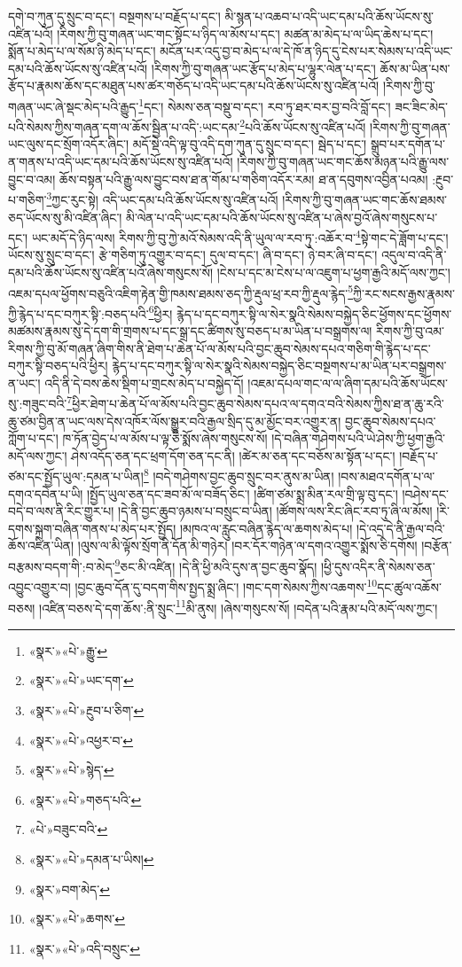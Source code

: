 དགེ་བ་ཀུན་དུ་སྲུང་བ་དང་། བསྔགས་པ་བརྗོད་པ་དང་། མི་སྙན་པ་འཆབ་པ་འདི་ཡང་དམ་པའི་ཆོས་ཡོངས་སུ་འཛིན་པའོ། །རིགས་ཀྱི་བུ་གཞན་ཡང་གང་སྟོང་པ་ཉིད་ལ་མོས་པ་དང་། མཚན་མ་མེད་པ་ལ་ཡིད་ཆེས་པ་དང་། སྨོན་པ་མེད་པ་ལ་སོམ་ཉི་མེད་པ་དང་། མངོན་པར་འདུ་བྱ་བ་མེད་པ་ལ་དེ་ཁོ་ན་ཉིད་དུ་ངེས་པར་སེམས་པ་འདི་ཡང་དམ་པའི་ཆོས་ཡོངས་སུ་འཛིན་པའོ། །རིགས་ཀྱི་བུ་གཞན་ཡང་རྩོད་པ་མེད་པ་ལྷུར་ལེན་པ་དང་། ཆོས་མ་ཡིན་པས་རྩོད་པ་རྣམས་ཆོས་དང་མཐུན་པས་ཚར་གཅོད་པ་འདི་ཡང་དམ་པའི་ཆོས་ཡོངས་སུ་འཛིན་པའོ། །རིགས་ཀྱི་བུ་གཞན་ཡང་ཞེ་སྡང་མེད་པའི་རྒྱུད་\footnote{«སྣར་»«པེ་»རྒྱུ་}དང་། སེམས་ཅན་བསྡུ་བ་དང་། རབ་ཏུ་ཐར་བར་བྱ་བའི་བློ་དང་། ཟང་ཟིང་མེད་པའི་སེམས་ཀྱིས་གཞན་དག་ལ་ཆོས་སྦྱིན་པ་འདི་:ཡང་དམ་\footnote{«སྣར་»«པེ་»ཡང་དག་}པའི་ཆོས་ཡོངས་སུ་འཛིན་པའོ། །རིགས་ཀྱི་བུ་གཞན་ཡང་ལུས་དང་སྲོག་འདོར་ཞིང་། མདོ་སྡེ་འདི་ལྟ་བུ་འདི་དག་ཀུན་དུ་སྲུང་བ་དང་། སྦེད་པ་དང་། སྒྲུབ་པར་དགོན་པ་ན་གནས་པ་འདི་ཡང་དམ་པའི་ཆོས་ཡོངས་སུ་འཛིན་པའོ། །རིགས་ཀྱི་བུ་གཞན་ཡང་གང་ཆོས་མཉན་པའི་རྒྱུ་ལས་བྱུང་བ་འམ། ཆོས་བསྟན་པའི་རྒྱུ་ལས་བྱུང་བས་ཐ་ན་གོམ་པ་གཅིག་འདོར་རམ། ཐ་ན་དབུགས་འབྱིན་པའམ། :རྔུབ་པ་གཅིག་\footnote{«སྣར་»«པེ་»རྔུབ་པ་ཅིག་}ཀྱང་རུང་སྟེ། འདི་ཡང་དམ་པའི་ཆོས་ཡོངས་སུ་འཛིན་པའོ། །རིགས་ཀྱི་བུ་གཞན་ཡང་གང་ཆོས་ཐམས་ཅད་ཡོངས་སུ་མི་འཛིན་ཞིང་། མི་ལེན་པ་འདི་ཡང་དམ་པའི་ཆོས་ཡོངས་སུ་འཛིན་པ་ཞེས་བྱའོ་ཞེས་གསུངས་པ་དང་། ཡང་མདོ་དེ་ཉིད་ལས། རིགས་ཀྱི་བུ་ཀྱེ་མའོ་སེམས་འདི་ནི་ཡུལ་ལ་རབ་ཏུ་:འཆོར་བ་\footnote{«སྣར་»«པེ་»འཕྱར་བ་}སྟེ་གང་དེ་ཟློག་པ་དང་། ཡོངས་སུ་སྲུང་བ་དང་། རྩེ་གཅིག་ཏུ་འགྱུར་བ་དང་། དུལ་བ་དང་། ཞི་བ་དང་། ཉེ་བར་ཞི་བ་དང་། འདུལ་བ་འདི་ནི་དམ་པའི་ཆོས་ཡོངས་སུ་འཛིན་པའོ་ཞེས་གསུངས་སོ། །ངེས་པ་དང་མ་ངེས་པ་ལ་འཇུག་པ་ཕྱག་རྒྱའི་མདོ་ལས་ཀྱང་། འཇམ་དཔལ་ཕྱོགས་བཅུའི་འཇིག་རྟེན་གྱི་ཁམས་ཐམས་ཅད་ཀྱི་རྡུལ་ཕྲ་རབ་ཀྱི་རྡུལ་རྙེད་\footnote{«སྣར་»«པེ་»སྙེད་}ཀྱི་རང་སངས་རྒྱས་རྣམས་ཀྱི་རྙེད་པ་དང་བཀུར་སྟི་:བཅད་པའི་\footnote{«སྣར་»«པེ་»གཅད་པའི་}ཕྱིར། རྙེད་པ་དང་བཀུར་སྟི་ལ་སེར་སྣའི་སེམས་བསྐྱེད་ཅིང་ཕྱོགས་དང་ཕྱོགས་མཚམས་རྣམས་སུ་དེ་དག་གི་གྲགས་པ་དང་སྒྲ་དང་ཚིགས་སུ་བཅད་པ་མ་ཡིན་པ་བསྒྲགས་ལ། རིགས་ཀྱི་བུ་འམ་རིགས་ཀྱི་བུ་མོ་གཞན་ཞིག་གིས་ནི་ཐེག་པ་ཆེན་པོ་ལ་མོས་པའི་བྱང་ཆུབ་སེམས་དཔའ་གཅིག་གི་རྙེད་པ་དང་བཀུར་སྟི་བཅད་པའི་ཕྱིར། རྙེད་པ་དང་བཀུར་སྟི་ལ་སེར་སྣའི་སེམས་བསྐྱེད་ཅིང་བསྔགས་པ་མ་ཡིན་པར་བསྒྲགས་ན་ཡང་། འདི་ནི་དེ་བས་ཆེས་སྡིག་པ་གྲངས་མེད་པ་བསྐྱེད་དོ། །འཇམ་དཔལ་གང་ལ་ལ་ཞིག་དམ་པའི་ཆོས་ཡོངས་སུ་:གཟུང་བའི་\footnote{«པེ་»བཟུང་བའི་}ཕྱིར་ཐེག་པ་ཆེན་པོ་ལ་མོས་པའི་བྱང་ཆུབ་སེམས་དཔའ་ལ་དགའ་བའི་སེམས་ཀྱིས་ཐ་ན་ཆུ་རའི་ཆུ་ཙམ་བྱིན་ན་ཡང་ལས་དེས་འཁོར་ལོས་སྒྱུར་བའི་རྒྱལ་སྲིད་དུ་མ་མྱོང་བར་འགྱུར་ན། བྱང་ཆུབ་སེམས་དཔའ་ཀློག་པ་དང་། ཁ་ཏོན་བྱེད་པ་ལ་མོས་པ་ལྟ་ཅི་སྨོས་ཞེས་གསུངས་སོ། །དེ་བཞིན་གཤེགས་པའི་ཡེ་ཤེས་ཀྱི་ཕྱག་རྒྱའི་མདོ་ལས་ཀྱང་། ཤེས་འདོད་ཅན་དང་ཕྲག་དོག་ཅན་དང་ནི། །ཚེར་མ་ཅན་དང་བཅོས་མ་སྟོན་པ་དང་། །བརྗོད་པ་ཙམ་དང་སྤྱོད་ཡུལ་:དམན་པ་ཡིན།\footnote{«སྣར་»«པེ་»དམན་པ་ཡིས།} །བདེ་གཤེགས་བྱང་ཆུབ་སྲུང་བར་ནུས་མ་ཡིན། །བས་མཐའ་དགོན་པ་ལ་དགའ་དབེན་པ་ཡི། །སྤྱོད་ཡུལ་ཅན་དང་ཟབ་མོ་ལ་བཟོད་ཅིང་། །ཚིག་ཙམ་སྨྲ་མིན་རལ་གྲི་ལྟ་བུ་དང་། །བཤེས་དང་བདེ་བ་ལས་ནི་རིང་གྱུར་པ། །དེ་ནི་བྱང་ཆུབ་ཉམས་པ་བསྲུང་བ་ཡིན། །ཚོགས་ལས་རིང་ཞིང་རབ་ཏུ་ཞི་ལ་མོས། །རི་དགས་སྐྲག་བཞིན་གནས་པ་མེད་པར་སྤྱོད། །མཁའ་ལ་རླུང་བཞིན་རྙེད་ལ་ཆགས་མེད་པ། །དེ་འདྲ་དེ་ནི་རྒྱལ་བའི་ཆོས་འཛིན་ཡིན། །ལུས་ལ་མི་ལྟོས་སྲོག་ནི་དོན་མི་གཉེར། །བར་དོར་གཉེན་ལ་དགའ་འགྱུར་སྨོས་ཅི་དགོས། །བརྩོན་བརྩམས་བདག་གི་:བ་མེད་\footnote{«སྣར་»བག་མེད་}ཅང་མི་འཛིན། །དེ་ནི་ཕྱི་མའི་དུས་ན་བྱང་ཆུབ་སྣོད། །ཕྱི་དུས་འདིར་ནི་སེམས་ཅན་འབྱུང་འགྱུར་བ། །བྱང་ཆུབ་དོན་དུ་བདག་གིས་སྤྱད་སྨྲ་ཞིང་། །གང་དག་སེམས་ཀྱིས་འཆགས་\footnote{«སྣར་»«པེ་»ཆགས་}དང་ཚུལ་འཆོས་བཅས། །འཛིན་བཅས་དེ་དག་ཆོས་:ནི་སྲུང་\footnote{«སྣར་»«པེ་»འདི་བསྲུང་}མི་ནུས། །ཞེས་གསུངས་སོ། །བདེན་པའི་རྣམ་པའི་མདོ་ལས་ཀྱང་། 